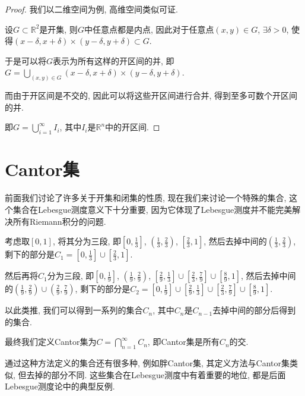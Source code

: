 \documentclass[theorem=false,mathfont=none,openany,sub3section]{easybook}
\begin{document}
\begin{proof}
  我们以二维空间为例, 高维空间类似可证.\par
  设$G\subset \mathbb{R}^2$是开集, 则$G$中任意点都是内点, 因此对于任意点$(x,y)\in G$, $\exists \delta >0$, 使得$(x-\delta,x+\delta)\times (y-\delta,y+\delta)\subset G$.\par
  于是可以将$G$表示为所有这样的开区间的并, 即$G=\bigcup_{(x,y)\in G}(x-\delta,x+\delta)\times (y-\delta,y+\delta)$.\par
  而由于开区间是不交的, 因此可以将这些开区间进行合并, 得到至多可数个开区间的并.\par
  即$G=\bigcup_{i=1}^{\infty}I_i$, 其中$I_i$是$\mathbb{R}^n$中的开区间.\par
\end{proof}

\newpage

\section{Cantor集}

前面我们讨论了许多关于开集和闭集的性质, 现在我们来讨论一个特殊的集合, 这个集合在Lebesgue测度意义下十分重要, 因为它体现了Lebesgue测度并不能完美解决所有Riemann积分的问题.\par

\begin{definition}
  考虑取$[0,1]$, 将其分为三段, 即$[0,\frac{1}{3}]$, $(\frac{1}{3},\frac{2}{3})$, $[\frac{2}{3},1]$, 然后去掉中间的$(\frac{1}{3},\frac{2}{3})$, 剩下的部分是$C_1=[0,\frac{1}{3}]\cup [\frac{2}{3},1]$.\par
  然后再将$C_1$分为三段, 即$[0,\frac{1}{9}]$, $(\frac{1}{9},\frac{2}{9})$, $[\frac{2}{9},\frac{1}{3}]\cup [\frac{2}{3},\frac{7}{9}]\cup [\frac{8}{9},1]$, 然后去掉中间的$(\frac{1}{9},\frac{2}{9})\cup (\frac{2}{9},\frac{7}{9})$, 剩下的部分是$C_2=[0,\frac{1}{9}]\cup [\frac{2}{9},\frac{1}{3}]\cup [\frac{2}{3},\frac{7}{9}]\cup [\frac{8}{9},1]$.\par
  以此类推, 我们可以得到一系列的集合$C_n$, 其中$C_n$是$C_{n-1}$去掉中间的部分后得到的集合.\par
  最终我们定义Cantor集为$C=\bigcap_{n=1}^{\infty}C_n$, 即Cantor集是所有$C_n$的交.\par
\end{definition}

\begin{remark}
  通过这种方法定义的集合还有很多种, 例如胖Cantor集, 其定义方法与Cantor集类似, 但去掉的部分不同. 这些集合在Lebesgue测度中有着重要的地位, 都是后面Lebesgue测度论中的典型反例.\par
\end{remark}
\end{document}
